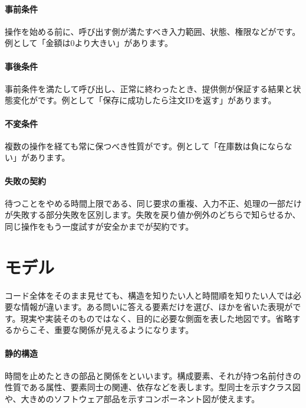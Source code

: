 \begingroup
\begingroup
\paragraph{事前条件}
        操作を始める前に、呼び出す側が満たすべき入力範囲、状態、権限などがです。例として「金額は0より大きい」があります。

\paragraph{事後条件}
        事前条件を満たして呼び出し、正常に終わったとき、提供側が保証する結果と状態変化がです。例として「保存に成功したら注文IDを返す」があります。

\par
\endgroup
\medskip
\begingroup
\paragraph{不変条件}
        複数の操作を経ても常に保つべき性質がです。例として「在庫数は負にならない」があります。

\paragraph{失敗の契約}
        待つことをやめる時間上限である、同じ要求の重複、入力不正、処理の一部だけが失敗する部分失敗を区別します。失敗を戻り値か例外のどちらで知らせるか、同じ操作をもう一度試すが安全かまでが契約です。

\par
\endgroup
  \vspace{4mm}
\par
\endgroup


\section{モデル}
\label{sec:04-software-engineering-09}

コード全体をそのまま見せても、構造を知りたい人と時間順を知りたい人では必要な情報が違います。ある問いに答える要素だけを選び、ほかを省いた表現がです。現実や実装そのものではなく、目的に必要な側面を表した地図です。省略するからこそ、重要な関係が見えるようになります。

\begingroup
\begingroup
\paragraph{静的構造}
        時間を止めたときの部品と関係をといいます。構成要素、それが持つ名前付きの性質である属性、要素同士の関連、依存などを表します。型同士を示すクラス図や、大きめのソフトウェア部品を示すコンポーネント図が使えます。

